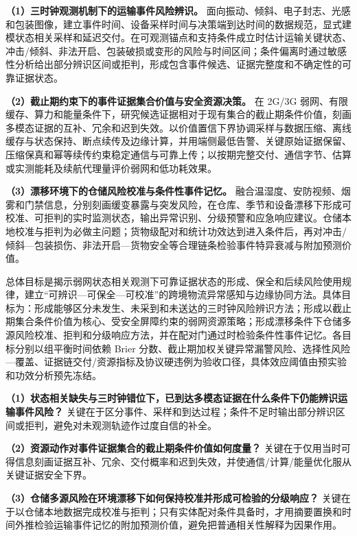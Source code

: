 \justifying
\NSFCBodyText


\textbf{（1）三时钟观测机制下的运输事件风险辨识。} 面向振动、倾斜、电子封志、光感和包装图像，建立事件时间、设备采样时间与决策端到达时间的数据规范，显式建模状态相关采样和延迟交付。在可观测锚点和支持条件成立时估计运输关键状态、冲击/倾斜、非法开启、包装破损或变形的风险与时间区间；条件偏离时通过敏感性分析给出部分辨识区间或拒判，形成包含事件候选、证据完整度和不确定性的可靠证据状态。

\textbf{（2）截止期约束下的事件证据集合价值与安全资源决策。} 在 2G/3G 弱网、有限缓存、算力和能量条件下，研究候选证据相对于现有集合的截止期条件价值，刻画多模态证据的互补、冗余和迟到失效。以价值置信下界协调采样与数据压缩、离线缓存与状态保持、断点续传及边缘计算，并用端侧最低告警、关键原始证据保留、压缩保真和幂等续传约束稳定通信与可靠上传；以按期完整交付、通信字节、估算或实测能耗及续航代理量评价弱网和低功耗效果。

\textbf{（3）漂移环境下的仓储风险校准与条件性事件记忆。} 融合温湿度、安防视频、烟雾和门禁信息，分别刻画缓变暴露与突发风险，在仓库、季节和设备漂移下形成可校准、可拒判的实时监测状态，输出异常识别、分级预警和应急响应建议。仓储本地校准与拒判为必做主问题；货物级配对和统计功效达到进入条件后，再对冲击/倾斜—包装损伤、非法开启—货物安全等合理链条检验事件特异衰减与附加预测价值。


总体目标是揭示弱网状态相关观测下可靠证据状态的形成、保全和后续风险使用规律，建立“可辨识—可保全—可校准”的跨境物流异常感知与边缘协同方法。具体目标为：形成能够区分未发生、未采到和未送达的三时钟风险辨识方法；形成以截止期集合条件价值为核心、受安全屏障约束的弱网资源策略；形成漂移条件下仓储多源风险校准、拒判和分级响应方法，并在配对门通过时检验条件性事件记忆。各目标分别以组平衡时间依赖 Brier 分数、截止期加权关键异常漏警风险、选择性风险—覆盖、证据链交付/资源指标及协议硬违例为验收口径，具体效应阈值由预实验和功效分析预先冻结。


\textbf{（1）状态相关缺失与三时钟错位下，已到达多模态证据在什么条件下仍能辨识运输事件风险？} 关键在于区分事件、采样和到达过程；条件不足时输出部分辨识区间或拒判，避免对未观测轨迹作过度自信的补全。

\textbf{（2）资源动作对事件证据集合的截止期条件价值如何度量？} 关键在于仅用当时可得信息刻画证据互补、冗余、交付概率和迟到失效，并使通信/计算/能量优化服从关键证据安全下界。

\textbf{（3）仓储多源风险在环境漂移下如何保持校准并形成可检验的分级响应？} 关键在于以仓储本地数据完成校准与拒判；只有实体配对条件具备时，才用摘要置换和时间外推检验运输事件记忆的附加预测价值，避免把普通相关性解释为因果作用。
